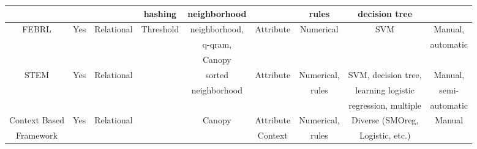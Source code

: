 \begin{table}
\begin{tabular}{|c|c|c|c|c|c|c|c|c|}
	&		&		&	hashing	&	neighborhood	&		&	rules	&	decision tree	&		\\ [0.1ex]
\hline																	
FEBRL  \cite{Chri08}	&	 Yes	&	Relational	&	Threshold	&	neighborhood,	&	Attribute 	&	Numerical	&	SVM	&	Manual, 	\\ [0.1ex]
	&		&		&		&	q-qram,	&		&		&		&	automatic	\\ [0.1ex]
	&		&		&		&	Canopy	&		&		&		&		\\ [0.1ex]
\hline																	
STEM \cite{KoRa08}	&	 Yes	&	Relational	&		&	sorted	&	Attribute 	&	Numerical,	&	 SVM, decision tree, 	&	 Manual, 	\\ [0.1ex]
	&		&		&		&	neighborhood	&		&	rules	&	learning logistic  	&	semi-	\\ [0.1ex]
	&		&		&		&		&		&		&	regression, multiple	&	automatic	\\ [0.1ex]
\hline																	
 Context Based 	&	 Yes	&	Relational	&		&	Canopy	&	Attribute 	&	Numerical,	&	Diverse (SMOreg, 	&	Manual	\\ [0.1ex]
Framework\cite{CKMe09}	&		&		&		&		&	Context	&	rules	&	Logistic, etc.)	&		\\ [0.1ex]
\hline 
\end{tabular}
\label{table:MLEMframeworks} %
\end{table}

